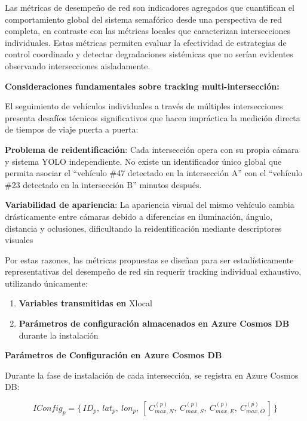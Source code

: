 \documentclass[12pt,a4paper,oneside]{report}
\begin{document}
Las métricas de desempeño de red son indicadores agregados que cuantifican el comportamiento global del sistema semafórico desde una perspectiva de red completa, en contraste con las métricas locales que caracterizan intersecciones individuales. Estas métricas permiten evaluar la efectividad de estrategias de control coordinado y detectar degradaciones sistémicas que no serían evidentes observando intersecciones aisladamente.

\textbf{Consideraciones fundamentales sobre tracking multi-intersección:}

El seguimiento de vehículos individuales a través de múltiples intersecciones presenta desafíos técnicos significativos que hacen impráctica la medición directa de tiempos de viaje puerta a puerta:

\textbf{Problema de reidentificación}: Cada intersección opera con su propia cámara y sistema YOLO independiente. No existe un identificador único global que permita asociar el ``vehículo \#47 detectado en la intersección A'' con el ``vehículo \#23 detectado en la intersección B'' minutos después.

\textbf{Variabilidad de apariencia}: La apariencia visual del mismo vehículo cambia drásticamente entre cámaras debido a diferencias en iluminación, ángulo, distancia y oclusiones, dificultando la reidentificación mediante descriptores visuales

Por estas razones, las métricas propuestas se diseñan para ser estadísticamente representativas del desempeño de red sin requerir tracking individual exhaustivo, utilizando únicamente:

\begin{enumerate}
\def\labelenumi{\arabic{enumi}.}
\item
  \textbf{Variables transmitidas en} Xlocal
\item
  \textbf{Parámetros de configuración almacenados en Azure Cosmos DB} durante la instalación
\end{enumerate}

\textbf{Parámetros de Configuración en Azure Cosmos DB}

Durante la fase de instalación de cada intersección, se registra en Azure Cosmos DB:

\begin{equation}
IConfig_{p} = \{\, ID_{p},\ lat_{p},\ lon_{p},\ [\, C_{max,N}^{(p)},\ C_{max,S}^{(p)},\ C_{max,E}^{(p)},\ C_{max,O}^{(p)} \,] \,\}
\label{eq:iconfig}
\end{equation}
\end{document}
